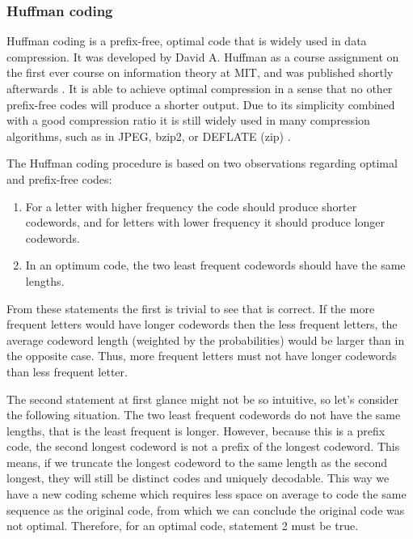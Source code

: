  

      \subsubsection{Huffman coding}

      Huffman coding is a prefix-free, optimal code that is widely used in data compression. It was developed by David A. Huffman as a course assignment on the first ever course on information theory at MIT, and was published shortly afterwards \cite{huffman_method_1952}. It is able to achieve optimal compression in a sense that no other prefix-free codes will produce a shorter output. Due to its simplicity combined with a good compression ratio it is still widely used in many compression algorithms, such as in JPEG, bzip2, or DEFLATE (zip) \cite{salomon_handbook_2010}.
      
  
      The Huffman coding procedure is based on two observations regarding optimal and prefix-free codes:
      \begin{enumerate}
        \item For a letter with higher frequency the code should produce shorter codewords, and for letters with lower frequency it should produce longer codewords.
        \item In an optimum code, the two least frequent codewords should have the same lengths.
      \end{enumerate}
  
      From these statements the first is trivial to see that is correct. If the more frequent letters would have longer codewords then the less frequent letters, the average codeword length (weighted by the probabilities) would be larger than in the opposite case. Thus, more frequent letters must not have longer codewords than less frequent letter.
  
      The second statement at first glance might not be so intuitive, so let's consider the following situation. The two least frequent codewords do not have the same lengths, that is the least frequent is longer. However, because this is a prefix code, the second longest codeword is not a prefix of the longest codeword. This means, if we truncate the longest codeword to the same length as the second longest, they will still be distinct codes and uniquely decodable. This way we have a new coding scheme which requires less space on average to code the same sequence as the original code, from which we can conclude the original code was not optimal. Therefore, for an optimal code, statement 2 must be true.
  
